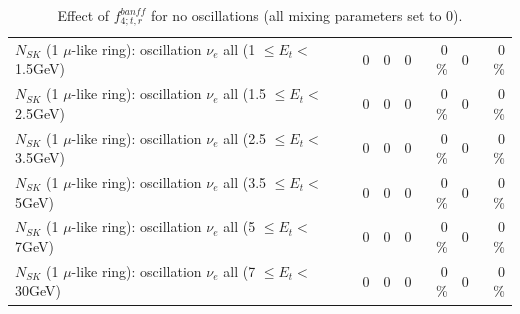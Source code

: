 \begin{table}
\begin{tabular}{| l | r | r | r  r | r  r |}
$N_{SK}$ (1 $\mu$-like ring): oscillation $\nu_{e}$ all (1 $\leq E_{t} <$ 1.5GeV) &               0 &               0 &               0 &        0 \%  &               0 &        0 \%  \\ 
$N_{SK}$ (1 $\mu$-like ring): oscillation $\nu_{e}$ all (1.5 $\leq E_{t} <$ 2.5GeV) &               0 &               0 &               0 &        0 \%  &               0 &        0 \%  \\ 
$N_{SK}$ (1 $\mu$-like ring): oscillation $\nu_{e}$ all (2.5 $\leq E_{t} <$ 3.5GeV) &               0 &               0 &               0 &        0 \%  &               0 &        0 \%  \\ 
$N_{SK}$ (1 $\mu$-like ring): oscillation $\nu_{e}$ all (3.5 $\leq E_{t} <$ 5GeV) &               0 &               0 &               0 &        0 \%  &               0 &        0 \%  \\ 
 $N_{SK}$ (1 $\mu$-like ring): oscillation $\nu_{e}$ all (5 $\leq E_{t} <$ 7GeV) &               0 &               0 &               0 &        0 \%  &               0 &        0 \%  \\ 
$N_{SK}$ (1 $\mu$-like ring): oscillation $\nu_{e}$ all (7 $\leq E_{t} <$ 30GeV) &               0 &               0 &               0 &        0 \%  &               0 &        0 \%  \\ 
\hline
\hline
\end{tabular}
\caption{ Effect of $f_{4; t, r}^{banff}$ for no oscillations (all mixing parameters set to 0). }
\label{tab:num_banff_04_1RmuT_3f_osc_t13:0}
\end{table}
\clearpage
